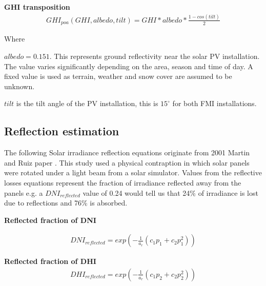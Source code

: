 \noindent\textbf{GHI transposition}\cite{sandia_poa_ghi}
%
\begin{equation}
\begin{split}
\label{sandia_eq_ghi}
GHI_{poa}(GHI, albedo, tilt)= GHI*albedo*\frac{1-cos(tilt)}{2}
\end{split}
\end{equation}

\noindent Where 

$albedo = 0.151$. This represents ground reflectivity near the solar PV installation. The value varies significantly depending on the area, season and time of day. A fixed value is used as terrain, weather and snow cover are assumed to be unknown.

$tilt$ is the tilt angle of the PV installation, this is $15^\circ$ for both FMI installations.


\newpage
\subsection{Reflection estimation}
The following Solar irradiance reflection equations originate from 2001 Martin and Ruiz paper \cite{solar_reflections}. This study used a physical contraption in which solar panels were rotated under a light beam from a solar simulator. Values from the reflective losses equations represent the fraction of irradiance reflected away from the panels e.g. a $DNI_{reflected}$ value of 0.24 would tell us that 24\% of irradiance is lost due to reflections and 76\% is absorbed. 

\noindent\textbf{Reflected fraction of DNI}

\begin{equation} 
\begin{split}
\label{solar_reflecive_dni_loss} 
DNI_{reflected}= exp(-\frac{1}{a_r}(c_1 p_1 +c_2 p_1^2))
\end{split}
\end{equation}


\noindent\textbf{Reflected fraction of DHI}
%
\begin{equation}
\begin{split}
\label{solar_reflecive_dhi_loss}
DHI_{reflected}= exp(-\frac{1}{a_r}(c_1 p_2 +c_2 p_2^2))
\end{split}
\end{equation}

